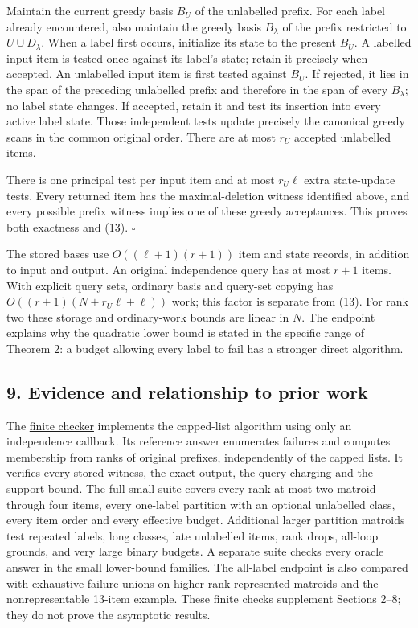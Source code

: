Maintain the current greedy basis \(B_U\) of the unlabelled prefix. For each label already encountered, also maintain the greedy basis \(B_\lambda\) of the prefix restricted to \(U\cup D_\lambda\). When a label first occurs, initialize its state to the present \(B_U\). A labelled input item is tested once against its label's state; retain it precisely when accepted. An unlabelled input item is first tested against \(B_U\). If rejected, it lies in the span of the preceding unlabelled prefix and therefore in the span of every \(B_\lambda\); no label state changes. If accepted, retain it and test its insertion into every active label state. Those independent tests update precisely the canonical greedy scans in the common original order. There are at most \(r_U\) accepted unlabelled items.

There is one principal test per input item and at most \(r_U\ell\) extra state-update tests. Every returned item has the maximal-deletion witness identified above, and every possible prefix witness implies one of these greedy acceptances. This proves both exactness and (13). \(\square\)

The stored bases use \(O((\ell+1)(r+1))\) item and state records, in addition to input and output. An original independence query has at most \(r+1\) items. With explicit query sets, ordinary basis and query-set copying has \(O((r+1)(N+r_U\ell+\ell))\) work; this factor is separate from (13). For rank two these storage and ordinary-work bounds are linear in \(N\). The endpoint explains why the quadratic lower bound is stated in the specific range of Theorem 2: a budget allowing every label to fail has a stronger direct algorithm.

\hypertarget{af-b41875cb6e-evidence-and-relationship-to-prior-work}{%
\subsection{9. Evidence and relationship to prior work}\label{af-b41875cb6e-evidence-and-relationship-to-prior-work}}

The \href{https://github.com/icekylinx/algorithm-frontier/blob/main/problems/matroid-failure-summaries/verify/check_rank_two_prefix.py}{finite checker} implements the capped-list algorithm using only an independence callback. Its reference answer enumerates failures and computes membership from ranks of original prefixes, independently of the capped lists. It verifies every stored witness, the exact output, the query charging and the support bound. The full small suite covers every rank-at-most-two matroid through four items, every one-label partition with an optional unlabelled class, every item order and every effective budget. Additional larger partition matroids test repeated labels, long classes, late unlabelled items, rank drops, all-loop grounds, and very large binary budgets. A separate suite checks every oracle answer in the small lower-bound families. The all-label endpoint is also compared with exhaustive failure unions on higher-rank represented matroids and the nonrepresentable 13-item example. These finite checks supplement Sections 2--8; they do not prove the asymptotic results.

